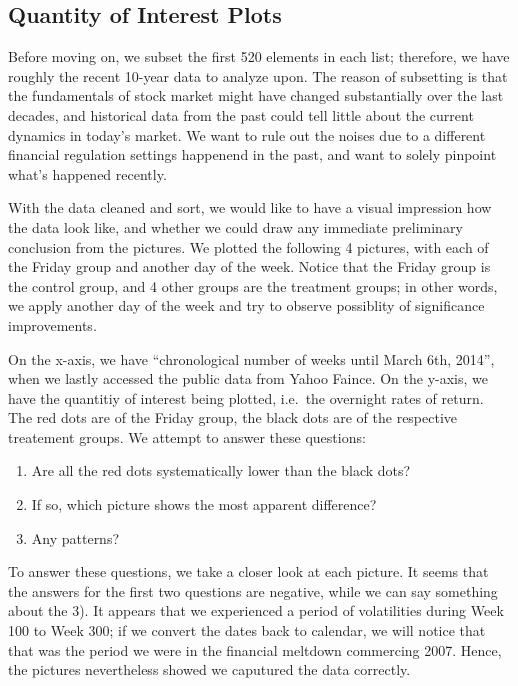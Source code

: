 \documentclass[letterpaper,10pt,english]{/Users/edwsurewin/anaconda/lib/python2.7/site-packages/sphinx/texinputs/sphinxhowto}
\begin{document}
\subsection{Quantity of Interest
Plots}\label{quantity-of-interest-plots}

Before moving on, we subset the first 520 elements in each list;
therefore, we have roughly the recent 10-year data to analyze upon. The
reason of subsetting is that the fundamentals of stock market might have
changed substantially over the last decades, and historical data from
the past could tell little about the current dynamics in today's market.
We want to rule out the noises due to a different financial regulation
settings happenend in the past, and want to solely pinpoint what's
happened recently.

With the data cleaned and sort, we would like to have a visual
impression how the data look like, and whether we could draw any
immediate preliminary conclusion from the pictures. We plotted the
following 4 pictures, with each of the Friday group and another day of
the week. Notice that the Friday group is the control group, and 4 other
groups are the treatment groups; in other words, we apply another day of
the week and try to observe possiblity of significance improvements.

On the x-axis, we have ``chronological number of weeks until March 6th,
2014'', when we lastly accessed the public data from Yahoo Faince. On
the y-axis, we have the quantitiy of interest being plotted, i.e.~the
overnight rates of return. The red dots are of the Friday group, the
black dots are of the respective treatement groups. We attempt to answer
these questions:

\begin{enumerate}
\def\labelenumi{\arabic{enumi})}
\itemsep1pt\parskip0pt
\item
  Are all the red dots systematically lower than the black dots?
\item
  If so, which picture shows the most apparent difference?
\item
  Any patterns?
\end{enumerate}

To answer these questions, we take a closer look at each picture. It
seems that the answers for the first two questions are negative, while
we can say something about the 3). It appears that we experienced a
period of volatilities during Week 100 to Week 300; if we convert the
dates back to calendar, we will notice that that was the period we were
in the financial meltdown commercing 2007. Hence, the pictures
nevertheless showed we caputured the data correctly.
\end{document}
